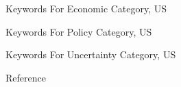 \documentclass[12pt]{beamer}
\begin{document}
\begin{frame}{Keywords For Economic Category, US}
\begin{table}[H]
\renewcommand\arraystretch{0.4}
\label{Taiwan policy keywords}
\begin{adjustwidth}{-0.0cm}{}
\begin{center}
\setlength{\tabcolsep}{0.5pt}
{
    \fontsize{8}{8} \selectfont
    
}
\end{center}
\end{adjustwidth}
\end{table}
\end{frame}


\begin{frame}{Keywords For Policy Category, US}
\begin{table}[H]
\renewcommand\arraystretch{1.}
\label{Taiwan policy keywords}
\begin{adjustwidth}{-0.0cm}{}
\begin{center}
\setlength{\tabcolsep}{13pt}
{
    \fontsize{8}{8} \selectfont
    
}
\end{center}
\end{adjustwidth}
\end{table}
\end{frame}


\begin{frame}{Keywords For Uncertainty Category, US}
\begin{table}[H]
\renewcommand\arraystretch{1.3}
\label{Taiwan policy keywords}
\begin{adjustwidth}{-0.0cm}{}
\begin{center}
\setlength{\tabcolsep}{12pt}
{
    \fontsize{8}{8} \selectfont
    
}
\end{center}
\end{adjustwidth}
\end{table}
\end{frame}



\begin{frame}{Reference}
\end{frame}
\end{document}
